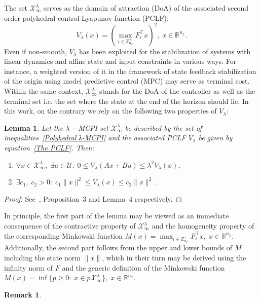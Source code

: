 \documentclass[letterpaper, 10 pt, conference]{ieeeconf}  %
\newcommand{\R}{\mathbb{R}}
\newcommand{\Z}{\mathbb{Z}}
\newcommand{\mc}[1]{\mathcal{#1}}
\newtheorem{lemma}{Lemma}
\newtheorem{remark}{Remark}
\begin{document}
The set $\mc{X}^{\lambda}_{\infty}$ serves as the domain of attraction (DoA) of the associated second order polyhedral control Lyapunov function (PCLF):
\begin{equation}\label{The PCLF}
V_{\lambda}(x) = \left(\max_{i \in \Z^{+}_{n_{F}}} F^{\top}_{i}x\right)^{2},\; x \in \R^{n_x}.
\end{equation}
Even if non-smooth, $V_{\lambda}$ has been exploited for the stabilization of systems with linear dynamics and affine state and input constraints in various ways. For instance, a weighted version of it in the framework of state feedback stabilization of the origin using model predictive control (MPC) may serve as terminal cost. Within the same context, $\mc{X}^{\lambda}_{\infty}$ stands for the DoA of the controller as well as the terminal set i.e. the set where the state at the end of the horizon should lie. In this work, on the contrary we rely on the following two properties of $V_{\lambda}$:
\begin{lemma}\label{PCLF homogeneity and monotonic decrease on DoA}
Let the $\lambda-$MCPI set $\mc{X}^{\lambda}_{\infty}$ be described by the set of inequalities~\eqref{Polyhedral λ-MCPI} and the associated PCLF $V_{\lambda}$ be given by equation~\eqref{The PCLF}. Then:
\begin{enumerate}
\renewcommand{\labelenumi}{\roman{enumi})}
\item $\forall x \in \mc{X}^{\lambda}_{\infty},\; \exists u \in \mc{U}:\; 0 \leq V_{\lambda}(Ax+Bu) \leq \lambda^{2}V_{\lambda}(x)$,
\item $\exists c_{1},\; c_{2} > 0:\; c_{1}\|x\|^{2} \leq V_{\lambda}(x) \leq c_{2}\|x\|^{2}$.
\end{enumerate}
\end{lemma}
\begin{proof}
See~\cite{Grammatico2012PCLF}, Proposition~3 and Lemma~4 respectively.
\end{proof}
In principle, the first part of the lemma may be viewed as an immediate consequence of the contractive property of $\mc{X}^{\lambda}_{\infty}$ and the homogeneity property of the corresponding Minkowski function $M(x) = \max_{i \in \mathbb{Z}^{+}_{n_{F}}} F^{\top}_{i}x,\; x \in \R^{n_x}$. Additionally, the second part follows from the upper and lower bounds of $M$ including the state norm $\|x\|$, which in their turn may be derived using the infinity norm of $F$ and the generic definition of the Minkowski function $M(x) = \inf\{p \geq 0:\; x \in p\mc{X}^{\lambda}_{\infty}\},\; x \in \R^{n_x}$.
\begin{remark}

\end{remark}
\end{document}
